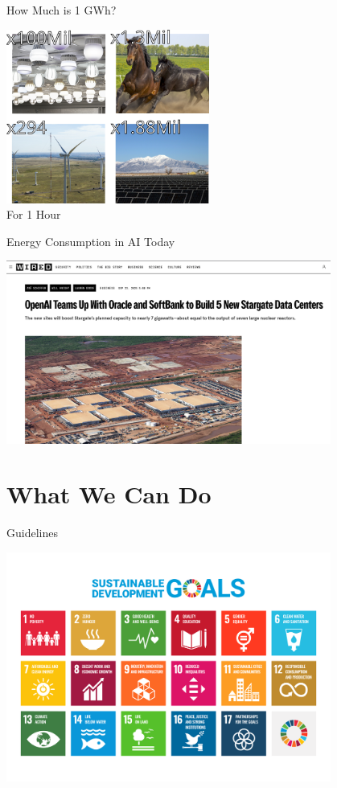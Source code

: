 \begin{frame}{How Much is 1 GWh? \cite{usde_how_2024}}
	\begin{center}
		\includegraphics[width=0.5\textwidth]{images/onegw.png} \\
		For 1 Hour
	\end{center}
\end{frame}

\begin{frame}{Energy Consumption in AI Today \cite{zoe_schiffer_openai_2025}}
	\begin{center}
		\includegraphics[width=0.8\textwidth]{images/wired-article.png}
	\end{center}
\end{frame}

\section{What We Can Do}

\begin{frame}{Guidelines \cite{united_nations_united_2015}}
	\begin{center}
		\includegraphics[width=0.8\textwidth]{images/E_SDG_poster_WEB.png}
	\end{center}
\end{frame}

